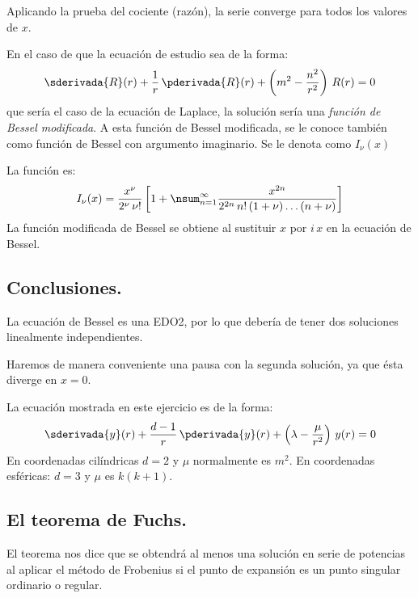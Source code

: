 Aplicando la prueba del cociente (razón), la serie converge para todos los valores de $x$.
\par
En el caso de que la ecuación de estudio sea de la forma:
\begin{align*}
\sderivada{R} (r) + \dfrac{1}{r} \, \pderivada{R} (r) + \left( m^{2} - \dfrac{n^{2}}{r^{2}} \right) \, R(r) = 0
\end{align*}
que sería el caso de la ecuación de Laplace, la solución sería una \emph{función de Bessel modificada}. A esta función de Bessel modificada, se le conoce también como función de Bessel con argumento imaginario. Se le denota como $I_{\nu}(x)$
\par
La función es:
\begin{align*}
I_{\nu}(x) = \dfrac{x^{\nu}}{2^{\nu} \, \nu!} \left[ 1 + \nsum_{n=1}^{\infty} \dfrac{x^{2n}}{2^{2n} \, n! \, (1 + \nu) \ldots (n + \nu)} \right]
\end{align*}
La función modificada de Bessel se obtiene al sustituir $x$ por $i \, x$ en la ecuación de Bessel.

\subsection*{Conclusiones.}

La ecuación de Bessel es una EDO2, por lo que debería de tener dos soluciones linealmente independientes.
\par
Haremos de manera conveniente una pausa con la segunda solución, ya que ésta diverge en $x=0$.
\par
La ecuación mostrada en este ejercicio es de la forma:
\begin{align*}
\sderivada{y}(r) + \dfrac{d - 1}{r} \, \pderivada{y}(r) + \left( \lambda - \dfrac{\mu}{r^{2}} \right) \, y(r) = 0
\end{align*}
En coordenadas cilíndricas $d = 2$ y $\mu$ normalmente es $m^{2}$. En coordenadas esféricas: $d = 3$ y $\mu$ es $k(k+1)$.

\subsection{El teorema de Fuchs.}
El teorema nos dice que se obtendrá al menos una solución en serie de potencias al aplicar el método de Frobenius si el punto de expansión es un punto singular ordinario o regular. 

